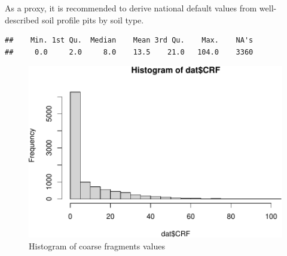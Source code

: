 \documentclass[10pt,b5paper,]{book}
\newenvironment{Shaded}{\begin{snugshade}}{\end{snugshade}}
\newcommand{\CommentTok}[1]{\textcolor[rgb]{0.56,0.35,0.01}{\textit{#1}}}
\newcommand{\DataTypeTok}[1]{\textcolor[rgb]{0.13,0.29,0.53}{#1}}
\newcommand{\DecValTok}[1]{\textcolor[rgb]{0.00,0.00,0.81}{#1}}
\newcommand{\KeywordTok}[1]{\textcolor[rgb]{0.13,0.29,0.53}{\textbf{#1}}}
\newcommand{\NormalTok}[1]{#1}
\newcommand{\OperatorTok}[1]{\textcolor[rgb]{0.81,0.36,0.00}{\textbf{#1}}}
\newcommand{\StringTok}[1]{\textcolor[rgb]{0.31,0.60,0.02}{#1}}
\theoremstyle{definition}
\theoremstyle{definition}
\theoremstyle{definition}
\theoremstyle{remark}
\begin{document}
As a proxy, it is recommended to derive national default values from
well-described soil profile pits by soil type.

\begin{Shaded}
\end{Shaded}

\begin{verbatim}
##    Min. 1st Qu.  Median    Mean 3rd Qu.    Max.    NA's 
##     0.0     2.0     8.0    13.5    21.0   104.0    3360
\end{verbatim}

\begin{Shaded}
\end{Shaded}

\begin{figure}
\centering
\includegraphics{SOCMapping_files/figure-latex/unnamed-chunk-10-1.pdf}
\caption{\label{fig:unnamed-chunk-10}Histogram of coarse fragments values}
\end{figure}
\end{document}
